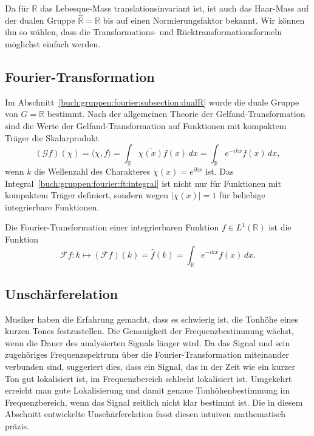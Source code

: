 Da für $\mathbb{R}$ das Lebesque-Mass translationsinvariant ist,
ist auch das Haar-Mass auf der dualen Gruppe $\hat{\mathbb{R}}=\mathbb{R}$
bis auf einen Normierungsfaktor bekannt.
Wir können ihn so wählen, dass die Transformations- und
Rücktransformationsformeln möglichst einfach werden.

%
%
\subsection{Fourier-Transformation
\label{buch:gruppen:fourier:subsection:transformation}}
Im Abschnitt~\ref{buch:gruppen:fourier:subsection:dualR} wurde die
duale Gruppe von $G=\mathbb{R}$ bestimmt.
Nach der allgemeinen Theorie der Gelfand-Transformation sind die
Werte der Gelfand-Transformation auf Funktionen mit kompaktem
Träger die Skalarprodukt
\begin{equation}
(\mathscr{G}f)(\chi)
=
\langle \chi,f\rangle
=
\int_{\mathbb{R}} \overline{\chi(x)} f(x)\,dx
=
\int_{\mathbb{R}} e^{-ikx} f(x)\,dx,
\label{buch:gruppen:fourier:ft:integral}
\end{equation}
wenn $k$ die Wellenzahl des Charakteres $\chi(x)=e^{ikx}$ ist.
Das Integral~\eqref{buch:gruppen:fourier:ft:integral} ist nicht nur
für Funktionen mit kompaktem Träger definiert, sondern wegen $|\chi(x)|=1$
für beliebige integrierbare Funktionen.

\begin{definition}
Die Fourier-Transformation einer integrierbaren Funktion $f\in L^1(\mathbb{R})$
%
ist die Funktion
\[
\mathscr{F}f
\colon
k\mapsto
(\mathscr{F}f)(k)
=
\hat{f}(k)
=
\int_{\mathbb{R}} e^{-ikx}f(x)\,dx.
\]
\end{definition}

%
%
\subsection{Unschärferelation
\label{buch:gruppen:fourier:subsection:unschaerfe}}
Musiker haben die Erfahrung gemacht, dass es schwierig ist, die
Tonhöhe eines kurzen Tones festzustellen.
Die Genauigkeit der Frequenzbestimmung wächst, wenn die Dauer des
analysierten Signals länger wird.
Da das Signal und sein zugehöriges Frequenzspektrum über die
Fourier-Transformation miteinander verbunden sind, suggeriert dies,
dass ein Signal, das in der Zeit wie ein kurzer Ton gut lokalisiert ist,
im Frequenzbereich schlecht lokalisiert ist.
Umgekehrt erreicht man gute Lokalisierung und damit genaue Tonhöhenbestimmung
im Frequenzbereich, wenn das Signal zeitlich nicht klar bestimmt ist.
Die in diesem Abschnitt entwickelte Unschärferelation fasst diesen intuiven
mathematisch präzis.

